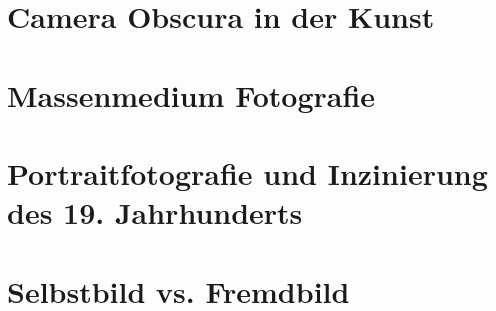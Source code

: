 \documentclass{beamer}
\begin{document}
\section{Camera Obscura in der Kunst}

\section{Massenmedium Fotografie}
\section{Portraitfotografie und Inzinierung des 19. Jahrhunderts}
\section{Selbstbild vs. Fremdbild}
\end{document}
